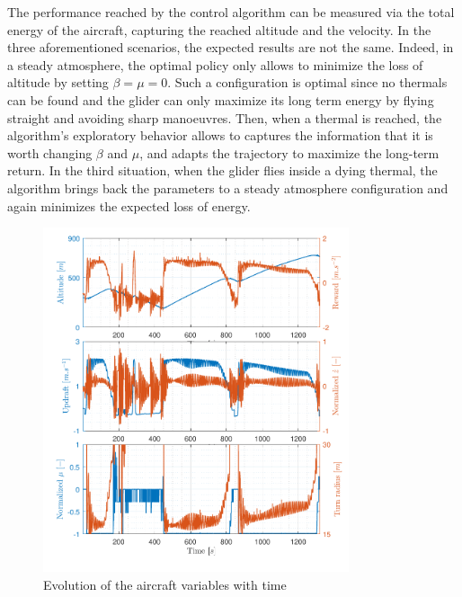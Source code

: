 \documentclass{jfpda}
\begin{document}
The performance reached by the control algorithm can be measured via the total energy of the aircraft, capturing the reached altitude and the velocity. In the three aforementioned scenarios, the expected results are not the same. Indeed, in a steady atmosphere, the optimal policy only allows to minimize the loss of altitude by setting $\beta = \mu = 0$. Such a configuration is optimal since no thermals can be found and the glider can only maximize its long term energy by flying straight and avoiding sharp manoeuvres. Then, when a thermal is reached, the algorithm's exploratory behavior allows to captures the information that it is worth changing $\beta$ and $\mu$, and adapts the trajectory to maximize the long-term return. In the third situation, when the glider flies inside a dying thermal, the algorithm brings back the parameters to a steady atmosphere configuration and again minimizes the expected loss of energy.


\begin{figure}
\begin{center}
 \includegraphics[width=9cm]{img/traj_var.pdf}
\end{center}
\caption{Evolution of the aircraft variables with time}
\label{fig:traj_rho}
\end{figure}
\end{document}
